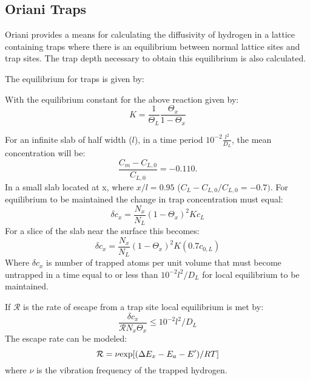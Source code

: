 \documentclass{article}
\def\H{\hat{H}}
\begin{document}
\subsection{Oriani Traps}
Oriani provides a means for calculating the diffusivity of hydrogen in a lattice
containing traps where there is an equilibrium between normal lattice sites and
trap sites. The trap depth necessary to obtain this equilibrium is also calculated.   

The equilibrium for traps is given by:
\begin{equation}
\end{equation}

With the equilibrium constant for the above reaction given by:
%
\begin{equation}
\label{eq:equilibrium}
K = \frac{1}{\Theta_{L}}\frac{\Theta_{x}}{1-\Theta_{x}}
\end{equation}

For an infinite slab of half width ($l$), in a time period
$10^{-2}\frac{l^{2}}{D_{L}}$, the mean concentration will be:
%
\begin{equation}
\frac{C_{m} - C_{L,0}}{C_{L,0}}=-0.110.
\end{equation}
%
In a small slab located at x, where $x/l=0.95$ ($C_{L}-C_{L,0}/C_{L,0}=-0.7)$.
For equilibrium to be maintained the change in trap concentration must equal:
%
\begin{equation}
\delta c_{x} = \frac{N_{x}}{N_{L}}(1-\Theta_{x})^{2}Kc_{L}
\end{equation}
%
For a slice of the slab near the surface this becomes:
%
\begin{equation}
\delta c_{x} = \frac{N_{x}}{N_{L}}(1-\Theta_{x})^{2}K(0.7c_{0,L})
\end{equation}
%
Where $\delta c_{x}$ is number of trapped atoms per unit volume
that must become untrapped in a time equal to 
or less than $10^{-2}l^{2}/D_{L}$ for local equilibrium to be maintained.

If $\mathcal{R}$ is the rate of escape from a trap site local equilibrium is met by:
%
\begin{equation}
\label{eq:timeconst}
\frac{\delta c_{x}}{\mathcal{R}N_{x}\Theta_{x}} \le 10^{-2}l^{2}/D_{L}
\end{equation}
%
The escape rate can be modeled:
%
\begin{equation}
\mathcal{R} = \nu {\rm exp}[(\Delta E_{x} - E_{a} - E')/RT]
\end{equation}
%
where $\nu$ is the vibration frequency of the trapped hydrogen.
\end{document}
